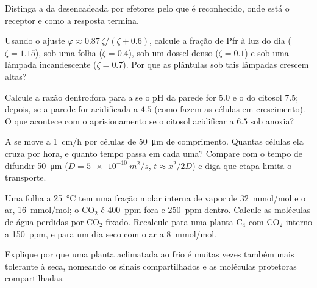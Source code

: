 \begin{exercise}[$\star$]\label{exo:b3:plant-molecular-physiology:4}
Distinga a  da desencadeada por
efetores pelo que é reconhecido, onde está o receptor e como a resposta
termina.
\end{exercise}

\begin{exercise}[$\star\star$]\label{exo:b3:plant-molecular-physiology:5}
Usando o ajuste $\varphi \approx 0.87\,\zeta/(\zeta + 0.6)$, calcule a
fração de Pfr à luz do dia ($\zeta = 1.15$), sob uma folha ($\zeta =
0.4$), sob um dossel denso ($\zeta = 0.1$) e sob uma lâmpada
incandescente ($\zeta = 0.7$). Por que as plântulas sob tais lâmpadas
crescem altas?
\end{exercise}

\begin{exercise}[$\star\star$]\label{exo:b3:plant-molecular-physiology:6}
Calcule a razão dentro:fora para a  se o pH da parede for $5.0$ e
o do citosol $7.5$; depois, se a parede for acidificada a $4.5$ (como
fazem as células em crescimento). O que acontece com o aprisionamento se
o citosol acidificar a $6.5$ sob anoxia?
\end{exercise}

\begin{exercise}[$\star\star$]\label{exo:b3:plant-molecular-physiology:7}
A  se move a \qty{1}{cm/h} por células de \qty{50}{\micro m} de
comprimento. Quantas células ela cruza por hora, e quanto tempo passa em
cada uma? Compare com o tempo de difundir \qty{50}{\micro m} ($D =
\qty{5e-10}{m^2/s}$, $t \approx x^{2}/2D$) e diga que etapa limita o
transporte.
\end{exercise}

\begin{exercise}[$\star\star$]\label{exo:b3:plant-molecular-physiology:8}
Uma folha a \qty{25}{\celsius} tem uma fração molar interna de vapor de
\qty{32}{mmol/mol} e o ar, \qty{16}{mmol/mol}; o CO$_{2}$ é
\qty{400}{ppm} fora e \qty{250}{ppm} dentro. Calcule as moléculas de água
perdidas por CO$_{2}$ fixado. Recalcule para uma planta C$_{4}$ com
CO$_{2}$ interno a \qty{150}{ppm}, e para um dia seco com o ar a
\qty{8}{mmol/mol}.
\end{exercise}

\begin{exercise}[$\star\star$]\label{exo:b3:plant-molecular-physiology:9}
Explique por que uma planta aclimatada ao frio é muitas vezes também
mais tolerante à seca, nomeando os sinais compartilhados e as moléculas
protetoras compartilhadas.
\end{exercise}

